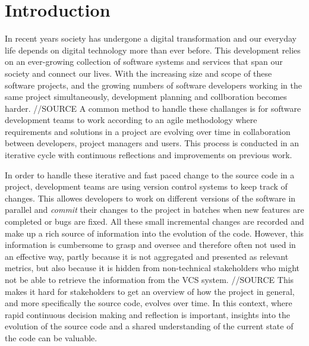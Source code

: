 

\section{Introduction}
In recent years society has undergone a digital transformation and our everyday life depends on digital technology more than ever before. 
This development relies on an ever-growing collection of software systems and services that span our society and connect our lives. 
With the increasing size and scope of these software projects, and the growing numbers of software developers working in the same project simultaneously, development planning and collboration becomes harder. //SOURCE
A common method to handle these challanges is for software development teams to work according to an agile methodology \cite{hazzan_agile_2014} where requirements and solutions in a project are evolving over time in collaboration between developers, project managers and users. 
This process is conducted in an iterative cycle with continuous reflections and improvements on previous work.

In order to handle these iterative and fast paced change to the source code in a project, development teams are using version control systems to keep track of changes. 
This allowes developers to work on different versions of the software in parallel and \textit{commit} their changes to the project in batches when new features are completed or bugs are fixed.
All these small incremental changes are recorded and make up a rich source of information into the evolution of the code. 
However, this information is cumbersome to grasp and oversee and therefore often not used in an effective way, partly because it is not aggregated and presented as relevant metrics, but also because it is hidden from non-technical stakeholders who might not be able to retrieve the information from the VCS system. //SOURCE
This makes it hard for stakeholders to get an overview of how the project in general, and more specifically the source code, evolves over time.
In this context, where rapid continuous decision making and reflection is important, insights into the evolution of the source code and a shared understanding of the current state of the code can be valuable. \cite{ball_if_1997}

